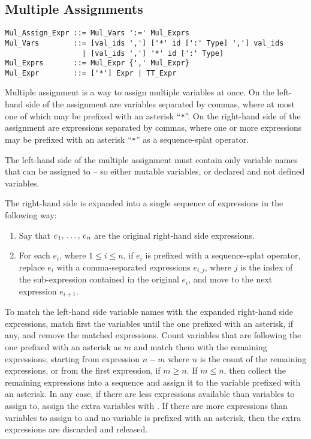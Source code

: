 \subsection{Multiple Assignments}
\label{sec:multiple-assignments}

\syntax\begin{lstlisting}
Mul_Assign_Expr ::= Mul_Vars ':=' Mul_Exprs
Mul_Vars        ::= [val_ids ','] ['*' id [':' Type] ','] val_ids
                  | [val_ids ','] '*' id [':' Type]
Mul_Exprs       ::= Mul_Expr {',' Mul_Expr}
Mul_Expr        ::= ['*'] Expr | TT_Expr
\end{lstlisting}

Multiple assignment is a way to assign multiple variables at once. On the left-hand side of the assignment are variables separated by commas, where at most one of which may be prefixed with an asterisk ``\lstinline!*!''. On the right-hand side of the assignment are expressions separated by commas, where one or more expressions may be prefixed with an asterisk ``\lstinline!*!'' as a sequence-splat operator. 

The left-hand side of the multiple assignment must contain only variable names that can be assigned to -- so either mutable variables, or declared and not defined variables. 

The right-hand side is expanded into a single sequence of expressions in the following way:
\begin{enumerate}
\item Say that $e_1 ,\, \ldots ,\, e_n$ are the original right-hand side expressions. 

\item For each $e_i$, where $1 \leq i \leq n$, if $e_i$ is prefixed with a sequence-splat operator, replace $e_i$ with a comma-separated expressions $e_{i,j}$, where $j$ is the index of the sub-expression contained in the original $e_i$, and move to the next expression $e_{i+1}$. 
\end{enumerate}

To match the left-hand side variable names with the expanded right-hand side expressions, match first the variables until the one prefixed with an asterisk, if any, and remove the matched expressions. Count variables that are following the one prefixed with an asterisk as $m$ and match them with the remaining expressions, starting from expression $n - m$ where $n$ is the count of the remaining expressions, or from the first expression, if $m \geq n$. If $m \leq n$, then collect the remaining expressions into a sequence and assign it to the variable prefixed with an asterisk. In any case, if there are less expressions available than variables to assign to, assign the extra variables with . If there are more expressions than variables to assign to and no variable is prefixed with an asterisk, then the extra expressions are discarded and released. 

